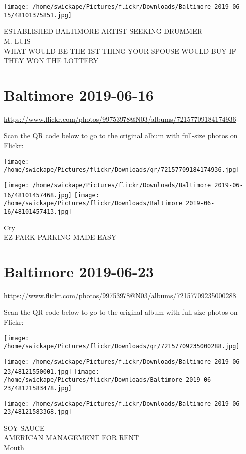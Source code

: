 \documentclass[10pt,letterpaper]{article}
\begin{document}
\texttt{[image: /home/swickape/Pictures/flickr/Downloads/Baltimore 2019-06-15/48101375851.jpg]}

ESTABLISHED BALTIMORE ARTIST SEEKING DRUMMER\\
M. LUIS\\
WHAT WOULD BE THE 1ST THING YOUR SPOUSE WOULD BUY IF THEY WON THE LOTTERY
\pagebreak

\section*{Baltimore 2019-06-16}

\url{https://www.flickr.com/photos/99753978@N03/albums/72157709184174936}

Scan the QR code below to go to the original album with full-size photos on Flickr:

\texttt{[image: /home/swickape/Pictures/flickr/Downloads/qr/72157709184174936.jpg]}
\pagebreak

\texttt{[image: /home/swickape/Pictures/flickr/Downloads/Baltimore 2019-06-16/48101457468.jpg]}
\texttt{[image: /home/swickape/Pictures/flickr/Downloads/Baltimore 2019-06-16/48101457413.jpg]}

Cry\\
EZ PARK PARKING MADE EASY
\pagebreak

\section*{Baltimore 2019-06-23}

\url{https://www.flickr.com/photos/99753978@N03/albums/72157709235000288}

Scan the QR code below to go to the original album with full-size photos on Flickr:

\texttt{[image: /home/swickape/Pictures/flickr/Downloads/qr/72157709235000288.jpg]}
\pagebreak

\texttt{[image: /home/swickape/Pictures/flickr/Downloads/Baltimore 2019-06-23/48121550001.jpg]}
\texttt{[image: /home/swickape/Pictures/flickr/Downloads/Baltimore 2019-06-23/48121583478.jpg]}

\texttt{[image: /home/swickape/Pictures/flickr/Downloads/Baltimore 2019-06-23/48121583368.jpg]}

SOY SAUCE\\
AMERICAN MANAGEMENT FOR RENT\\
Mouth
\pagebreak
\end{document}
